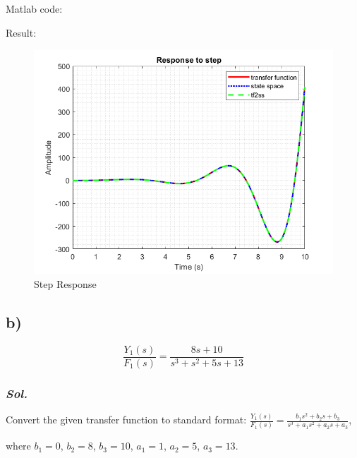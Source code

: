 Matlab code:
    
Result:
\begin{figure}[htp]
    \centering
    \includegraphics[width=12cm]{images/Q5_a_fig.png}
    \caption{Step Response}
    \label{fig:Q5a}
\end{figure}


\subsection{b)}
\begin{equation}
    \frac{Y_1(s)}{F_1(s)} = \frac{8s+10}{s^3+s^2+5s+13}
\end{equation}

\subsubsection{\textit{ Sol. }}
Convert the given transfer function to standard format:
$\frac{Y_1(s)}{F_1(s)} = \frac{b_1s^2+b_2s+b_3}{s^3+a_1s^2+a_2s+a_3}$, 

where $b_1 =0$, $b_2=8$, $b_3 = 10$, $a_1 = 1$, $a_2 = 5$, $a_3 = 13$.

